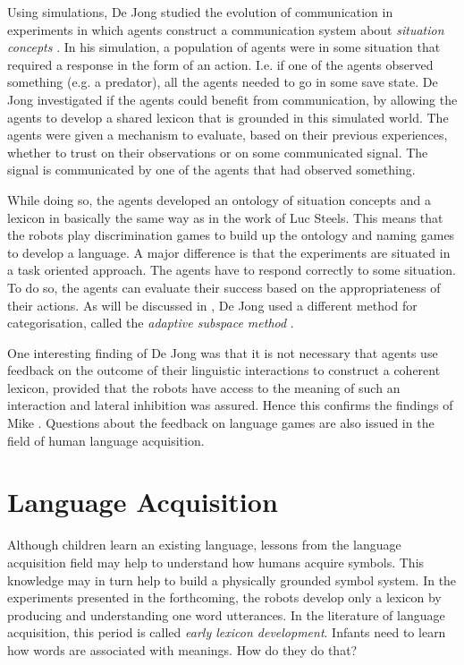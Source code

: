 Using simulations, De Jong studied  the evolution of communication in experiments in which agents construct a communication system about {\em situation concepts} \citep{dejong:99b}. In his simulation, a population of agents were in some situation that required a response in the form of an action. I.e.  if one of the agents observed something (e.g. a predator), all the agents needed to go in some save state. De Jong investigated if the agents could benefit from communication, by allowing the agents to develop a shared lexicon that is grounded in this simulated world. The agents were given a mechanism to evaluate, based on their previous experiences, whether to trust on their observations or on some communicated signal. The signal is communicated by one of the agents that had observed something.

While doing so, the agents developed an ontology of situation concepts and a lexicon in basically the same way as in the work of Luc Steels. This means that the robots play discrimination games to build up the ontology and naming games to develop a language. A major difference is that the experiments are situated in a task oriented approach. The agents have to respond correctly to some situation. To do so, the agents can evaluate their success based on the appropriateness of their actions. As will be discussed in , De Jong used a different method for categorisation, called the {\em adaptive subspace method} \citep{dejongvogt:1998}.

One interesting finding of De Jong was that it is not necessary that agents use feedback on the outcome of their linguistic interactions to construct a coherent lexicon, provided that the robots have access to the meaning of such an interaction and lateral inhibition was assured. Hence this confirms the findings of Mike \citet{oliphant:1998}. Questions about the feedback on language games are also issued in the field of human language acquisition.


\section{Language Acquisition}\label{s:intro:acquisition}

Although children learn an existing language, lessons from the language acquisition field may help to understand how humans acquire symbols. This knowledge may in turn help to build a physically grounded symbol system. In the experiments presented in the forthcoming, the robots develop only a lexicon by producing and understanding one word utterances. In the literature of language acquisition, this period is called {\em early lexicon development}. Infants need to learn how words are associated with meanings. How do they do that?

